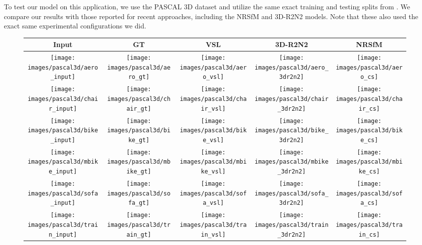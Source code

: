 \documentclass[10pt,twocolumn,letterpaper]{article}
\begin{document}
To test our model on this application, we use the PASCAL 3D \cite{xiang_wacv14} dataset and utilize the same exact training and testing splits from \cite{kar2015category}. We compare our results with those reported for recent approaches, including the NRSfM \cite{kar2015category} and 3D-R2N2 \cite{choy20163d} models. Note that these also used the exact same experimental configurations we did.

\begin{figure}[ht!]
  \centering
  \small
  \setlength\tabcolsep{3pt}
    \begin{tabular}{ccccc}
    Input & GT & VSL & 3D-R2N2\cite{choy20163d}   & NRSfM\cite{kar2015category}  \\
    \toprule
   \texttt{[image: images/pascal3d/aero\_input]}    &  \texttt{[image: images/pascal3d/aero\_gt]}     &  \texttt{[image: images/pascal3d/aero\_vsl]}     &    \texttt{[image: images/pascal3d/aero\_3dr2n2]}   &    \texttt{[image: images/pascal3d/aero\_cs]}   \\
    \texttt{[image: images/pascal3d/chair\_input]}    &  \texttt{[image: images/pascal3d/chair\_gt]}     &  \texttt{[image: images/pascal3d/chair\_vsl]}    &    \texttt{[image: images/pascal3d/chair\_3dr2n2]} &    \texttt{[image: images/pascal3d/chair\_cs]}      \\
    \texttt{[image: images/pascal3d/bike\_input]}     &  \texttt{[image: images/pascal3d/bike\_gt]}   &    \texttt{[image: images/pascal3d/bike\_vsl]}      &   \texttt{[image: images/pascal3d/bike\_3dr2n2]}     & \texttt{[image: images/pascal3d/bike\_cs]}      \\  \texttt{[image: images/pascal3d/mbike\_input]}     &  \texttt{[image: images/pascal3d/mbike\_gt]}   &    \texttt{[image: images/pascal3d/mbike\_vsl]}      &   \texttt{[image: images/pascal3d/mbike\_3dr2n2]}       & \texttt{[image: images/pascal3d/mbike\_cs]}   \\
    \texttt{[image: images/pascal3d/sofa\_input]}    &  \texttt{[image: images/pascal3d/sofa\_gt]}     &  \texttt{[image: images/pascal3d/sofa\_vsl]}     &    \texttt{[image: images/pascal3d/sofa\_3dr2n2]}   &    \texttt{[image: images/pascal3d/sofa\_cs]}   \\ \texttt{[image: images/pascal3d/train\_input]}     &  \texttt{[image: images/pascal3d/train\_gt]}   &    \texttt{[image: images/pascal3d/train\_vsl]}      &   \texttt{[image: images/pascal3d/train\_3dr2n2]}       & \texttt{[image: images/pascal3d/train\_cs]}  \\

\end{tabular}
\end{figure}
\end{document}

